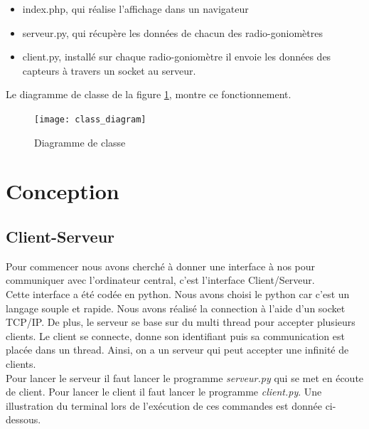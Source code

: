 \begin{itemize}
\item index.php, qui réalise l'affichage dans un navigateur
\item serveur.py, qui récupère les données de chacun des radio-goniomètres
\item client.py, installé sur chaque radio-goniomètre il envoie les données des capteurs à travers un socket au serveur.
\end{itemize}

Le diagramme de classe de la figure \ref{fig:class}, montre ce fonctionnement.

\begin{figure}[!h]
  \centering
  \texttt{[image: class\_diagram]}
  \caption{Diagramme de classe}
  \label{fig:class}
\end{figure}



\section{Conception}

\subsection{Client-Serveur}

Pour commencer nous avons cherché à donner une interface à nos \rpi pour communiquer avec l'ordinateur central, c'est l'interface Client/Serveur.
~\\

Cette interface a été codée en python. Nous avons choisi le python car c'est un langage souple et rapide. Nous avons réalisé la connection à l'aide d'un socket TCP/IP. De plus, le serveur se base sur du multi thread pour accepter plusieurs clients. Le client se connecte, donne son identifiant puis sa communication est placée dans un thread. Ainsi, on a un serveur qui peut accepter une infinité de clients.
~\\

Pour lancer le serveur il faut lancer le programme \textit{serveur.py} qui se met en écoute de client. Pour lancer le client il faut lancer le programme \textit{client.py}. Une illustration du terminal lors de l'exécution de ces commandes est donnée ci-dessous.
~\\

